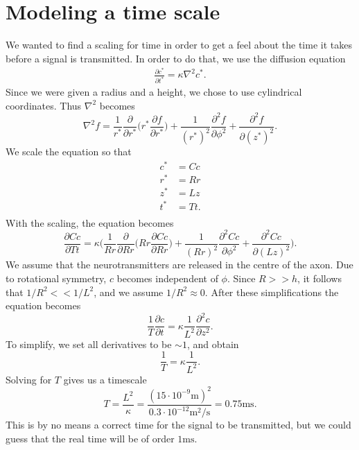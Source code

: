 \section{Modeling a time scale}
We wanted to find a scaling for time in order to get a feel about the time it takes before a signal is transmitted. In order to do that, we use the diffusion equation
\begin{align}
\label{diffusion_unscaled}
\frac{\partial c^{*}}{\partial t^{*}} = \kappa \nabla^2 c^{*}.
\end{align}
Since we were given a radius and a height, we chose to use cylindrical coordinates. Thus $\nabla^2$ becomes
$$ \nabla^2 f = \frac{1}{r^{*}} \frac{\partial}{\partial r^{*}} \Big( r^{*} \frac{\partial f}{\partial r^{*}} \Big) +\frac{1}{(r^{*})^2}\frac{\partial^2 f}{\partial \phi^2} + \frac{\partial^2 f}{\partial (z^{*})^2}. $$
We scale the equation so that
$$\begin{array}{lr}
c^{*} &= Cc\\ r^{*} &=Rr\\ z^{*} &= Lz\\ t^* &=Tt.\\
\end{array}$$
With the scaling, the equation becomes
$$\frac{\partial Cc}{\partial Tt} = \kappa \Bigg( \frac{1}{Rr} \frac{\partial }{\partial Rr} \Big( Rr \frac{\partial Cc}{\partial Rr} \Big) +\frac{1}{(Rr)^2}\frac{\partial^2 Cc}{\partial \phi^2} + \frac{\partial^2 Cc}{\partial (Lz)^2} \Bigg). $$
We assume that the neurotransmitters are released in the centre of the axon. Due to rotational symmetry, $c$ becomes independent of $\phi$. Since $R >> h$, it follows that $1/R^2<<1/L^2$, and we assume $1/R^2 \approx 0$. After these simplifications the equation becomes
$$\frac{1}{T} \frac{\partial c}{\partial t} = \kappa  \frac{1}{L^2}\frac{\partial^2 c}{\partial z^2} . $$
To simplify, we set all derivatives to be $ \sim 1 $, and obtain
$$\frac{1}{T}  = \kappa \frac{1}{L^2}.  $$
Solving for $T$ gives us a timescale
$$T = \frac{L^2}{\kappa} = \frac{(15\cdot 10^{-9}\text{m})^2}{0.3\cdot 10^{-12} \text{m$^2$/s}} = 0.75 \text{ms}. $$
This is by no means a correct time for the signal to be transmitted, but we could guess that the real time will be of order $1 \text{ms}$.